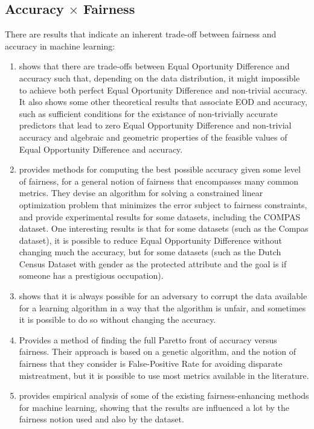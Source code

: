 \subsection{Accuracy $\times$ Fairness}

There are results that indicate an inherent trade-off between fairness and accuracy in machine learning:

\begin{enumerate}
\item \cite{Carlos} shows that there are trade-offs between Equal Oportunity Difference and accuracy such that, depending on the data distribution, it might impossible to achieve both perfect Equal Oportunity Difference and non-trivial accuracy. It also shows some other theoretical results that associate EOD and accuracy, such as sufficient conditions for the existance of non-trivially accurate predictors that lead to zero Equal Opportunity Difference and non-trivial accuracy and algebraic and geometric properties of the feasible values of Equal Opportunity Difference and accuracy.
\item \cite{Reductions} provides methods for computing the best possible accuracy given some level of fairness, for a general notion of fairness that encompasses many common metrics. They devise an algorithm for solving a constrained linear optimization problem that minimizes the error subject to fairness constraints, and provide experimental results for some datasets, including the COMPAS \cite{Compass} dataset. One interesting results is that for some datasets (such as the Compas dataset), it is possible to reduce Equal Opportunity Difference without changing much the accuracy, but for some datasets (such as the Dutch Census Dataset\cite{merono2017cedar} with gender as the protected attribute and the goal is if someone has a prestigious occupation).
\item \cite{konstantinov2022impossibility} shows that it is always possible for an adversary to corrupt the data available for a learning algorithm in a way that the algorithm is unfair, and sometimes it is possible to do so without changing the accuracy.
\item \cite{valdivia2021fair} Provides a method of finding the full Paretto front of accuracy versus fairness. Their approach is based on a genetic algorithm, and the notion of fairness that they consider is False-Positive Rate for avoiding disparate mistreatment, but it is possible to use most metrics available in the literature.
\item \cite{friedler2019comparative} provides empirical analysis of some of the existing fairness-enhancing methods for machine learning, showing that the results are influenced a lot by the fairness notion used and also by the dataset.
\end{enumerate}

